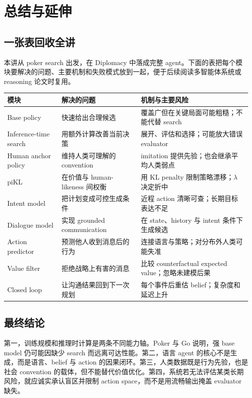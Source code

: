 \section{总结与延伸}

\subsection{一张表回收全讲}

本讲从 poker search 出发，在 Diplomacy 中落成完整 agent。下面的表把每个模块要解决的问题、主要机制和失败模式放到一起，便于后续阅读多智能体系统或 reasoning 论文时复用。

\begin{longtable}{L{0.20\textwidth}L{0.30\textwidth}L{0.40\textwidth}}
\toprule
模块 & 解决的问题 & 机制与主要风险 \\
\midrule
Base policy & 快速给出合理候选 & 覆盖广但在关键局面可能粗糙；不能代替 search \\
Inference-time search & 用额外计算改善当前决策 & 展开、评估和选择；可能放大错误 evaluator \\
Human anchor policy & 维持人类可理解的 convention & imitation 提供先验；也会继承平均人类弱点 \\
piKL & 在价值与 human-likeness 间权衡 & 用 KL penalty 限制策略漂移；$\lambda$ 决定折中 \\
Intent model & 把计划变成可控生成条件 & 近程 action 清晰可查；长期目标表达不足 \\
Dialogue model & 实现 grounded communication & 在 state、history 与 intent 条件下生成候选 \\
Action predictor & 预测他人收到消息后的行为 & 连接语言与策略；对分布外人类可能失准 \\
Value filter & 拒绝战略上有害的消息 & 比较 counterfactual expected value；忽略未建模后果 \\
Closed loop & 让沟通结果回到下一次规划 & 每个事件后重估 belief；复杂度和延迟上升 \\
\bottomrule
\end{longtable}

\subsection{最终结论}

第一，训练规模和推理时计算是两条不同能力轴。Poker 与 Go 说明，强 base model 仍可能因缺少 search 而远离可达性能。第二，语言 agent 的核心不是生成，而是语言、belief 与 action 的因果闭环。第三，人类数据既是行为先验，也是社会 convention 的载体，但不能替代价值优化。第四，系统若无法评估某类长期风险，就应诚实承认盲区并限制 action space，而不是用流畅输出掩盖 evaluator 缺失。

